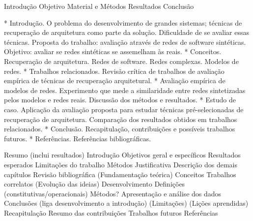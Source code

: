Introdução
Objetivo
Material e Métodos
Resultados
Conclusão


    *  Introdução. O problema do desenvolvimento de grandes sistemas; técnicas de recuperação de arquitetura como parte da solução. Dificuldade de se avaliar essas técnicas. Proposta do trabalho: avaliação através de redes de software sintéticas. Objetivo: avaliar se redes sintéticas se assemelham às reais.
    * Conceitos. Recuperação de arquitetura. Redes de software. Redes complexas. Modelos de redes.
    * Trabalhos relacionados. Revisão crítica de trabalhos de avaliação empírica de técnicas de recuperação arquitetural.
    * Avaliação empírica de modelos de redes. Experimento que mede a similaridade entre redes sintetizadas pelos modelos e redes reais. Discussão dos métodos e resultados.
    * Estudo de caso. Aplicação da avaliação proposta para estudar técnicas pré-selecionadas de recuperação de arquitetura. Comparação dos resultados obtidos em trabalhos relacionados.
    * Conclusão. Recapitulação, contribuições e possíveis trabalhos futuros.
    * Referências. Referências bibliográficas.


Resumo (inclui resultados)
Introdução
  Objetivos geral e específicos
  Resultados esperados
  Limitações do trabalho
  Métodos
  Justificativa
  Descrição dos demais capítulos
Revisão bibliográfica (Fundamentação teórica)
  Conceitos
  Trabalhos correlatos
  (Evolução das ideias)
Desenvolvimento
  Definições (constitutivas/operacionais)
  Métodos?
  Apresentação e análise dos dados
Conclusões (liga desenvolvimento a introdução)
  (Limitações)
  (Lições aprendidas)
  Recapitulação
  Resumo das contribuições
  Trabalhos futuros
Referências

